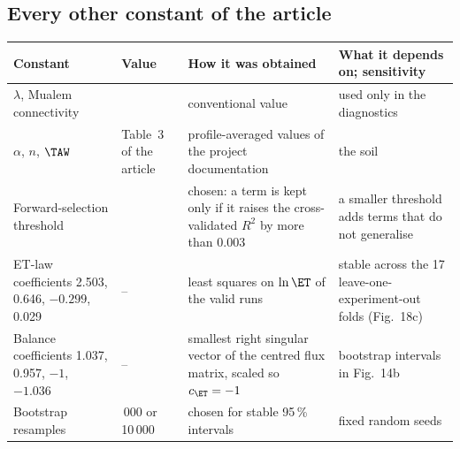 \subsection{Every other constant of the article}
{\small\begin{longtable}{>{\raggedright\arraybackslash}p{}>{\raggedright\arraybackslash}p{}>{\raggedright\arraybackslash}p{}>{\raggedright\arraybackslash}p{}}
\toprule Constant & Value & How it was obtained & What it depends on; sensitivity\\\midrule\endhead
$\lambda$, Mualem connectivity & 0.5 & conventional value \citep{Mualem1976} & used only in the diagnostics\\
$\alpha$, $n$, $\TAW$ & Table~3 of the article & profile-averaged values of the project documentation & the soil\\
Forward-selection threshold & 0.003 & chosen: a term is kept only if it raises the cross-validated $R^2$ by more than 0.003 & a smaller threshold adds terms that do not generalise\\
ET-law coefficients 2.503, 0.646, $-0.299$, 0.029 & -- & least squares on $\ln\ET$ of the valid runs & stable across the 17 leave-one-experiment-out folds (Fig.~18c)\\
Balance coefficients 1.037, 0.957, $-1$, $-1.036$ & -- & smallest right singular vector of the centred flux matrix, scaled so $c_{\ET}=-1$ & bootstrap intervals in Fig.~14b\\
Bootstrap resamples & 5\,000 or 10\,000 & chosen for stable 95\,\% intervals & fixed random seeds\\\bottomrule
\end{longtable}}
